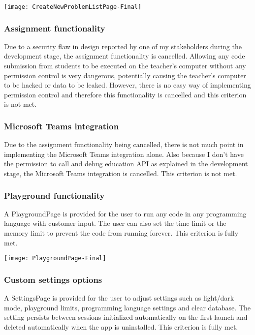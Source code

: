 \documentclass[report.tex]{subfiles}
\begin{document}
\texttt{[image: CreateNewProblemListPage-Final]}

\subsubsection{Assignment functionality}

Due to a security flaw in design reported by one of my stakeholders during the development stage, the assignment functionality is cancelled. Allowing any code submission from students to be executed on the teacher's computer without any permission control is very dangerous, potentially causing the teacher's computer to be hacked or data to be leaked. However, there is no easy way of implementing permission control and therefore this functionality is cancelled and this criterion is not met.

\subsubsection{Microsoft Teams integration}

Due to the assignment functionality being cancelled, there is not much point in implementing the Microsoft Teams integration alone. Also because I don't have the permission to call and debug education API as explained in the development stage, the Microsoft Teams integration is cancelled. This criterion is not met.

\subsubsection{Playground functionality}

A PlaygroundPage is provided for the user to run any code in any programming language with customer input. The user can also set the time limit or the memory limit to prevent the code from running forever. This criterion is fully met.

\texttt{[image: PlaygroundPage-Final]}

\subsubsection{Custom settings options}

A SettingsPage is provided for the user to adjust settings such as light/dark mode, playground limits, programming language settings and clear database. The setting persists between sessions initialized automatically on the first launch and deleted automatically when the app is uninstalled. This criterion is fully met.
\end{document}
